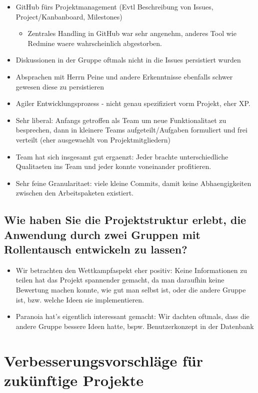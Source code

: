 \documentclass[12pt,DIV14,BCOR10mm,a4paper,parskip=half-,headsepline,headinclude,english,ngerman,bibliography=totocnumbered]{scrreprt}
\begin{document}
\begin{itemize}
  \item GitHub fürs Projektmanagement (Evtl Beschreibung von Issues, Project/Kanbanboard, Milestones)
  \begin{itemize}
    \item Zentrales Handling in GitHub war sehr angenehm, anderes Tool wie Redmine waere wahrscheinlich abgestorben.
  \end{itemize}
  \item Diskussionen in der Gruppe oftmals nicht in die Issues persistiert wurden
  \item Absprachen mit Herrn Peine und andere Erkenntnisse ebenfalls schwer gewesen diese zu persistieren
  \item Agiler Entwicklungsprozess - nicht genau spezifiziert vorm Projekt, eher XP.
  \item Sehr liberal: Anfangs getroffen als Team um neue Funktionalitaet zu besprechen, dann in kleinere Teams aufgeteilt/Aufgaben formuliert und frei verteilt (eher ausgewaehlt von Projektmitgliedern)
  \item Team hat sich insgesamt gut ergaenzt: Jeder brachte unterschiedliche Qualitaeten ins Team und jeder konnte voneinander profitieren.
  \item Sehr feine Granularitaet: viele kleine Commits, damit keine Abhaengigkeiten zwischen den Arbeitspaketen existiert.
\end{itemize}




\section{Wie haben Sie die Projektstruktur erlebt, die Anwendung durch zwei Gruppen mit Rollentausch entwickeln zu lassen?}

\begin{itemize}
  \item Wir betrachten den Wettkampfaspekt eher positiv: Keine Informationen zu teilen hat das Projekt spannender gemacht, da man daraufhin keine Bewertung machen konnte, wie gut man selbst ist, oder die andere Gruppe ist, bzw. welche Ideen sie implementieren.
  \item Paranoia hat's eigentlich interessant gemacht: Wir dachten oftmals, dass die andere Gruppe bessere Ideen hatte, bspw. Benutzerkonzept in der Datenbank
\end{itemize}

\chapter{Verbesserungsvorschläge für zukünftige Projekte}
\end{document}
